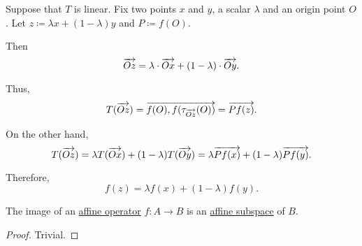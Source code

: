 \begin{defproof}
   Suppose that \( T \) is linear. Fix two points \( x \) and \( y \), a scalar \( \lambda \) and an origin point \( O \). Let \( z \coloneqq \lambda x + (1 - \lambda) y \) and \( P \coloneqq f(O) \).

  Then
  \begin{equation*}
    \overrightarrow{Oz} = \lambda \cdot \overrightarrow{Ox} + (1 - \lambda) \cdot \overrightarrow{Oy}.
  \end{equation*}

  Thus,
  \begin{equation*}
    T(\overrightarrow{Oz}) = \overrightarrow{ f(O), f(\tau_{\overrightarrow{Oz}}(O)) } = \overrightarrow{ P f(z) }.
  \end{equation*}

  On the other hand,
  \begin{equation*}
    T(\overrightarrow{Oz})
    =
    \lambda T(\overrightarrow{Ox}) + (1 - \lambda) T(\overrightarrow{Oy})
    =
    \lambda \overrightarrow{ P f(x) } + (1 - \lambda) \overrightarrow{ P f(y) }.
  \end{equation*}

  Therefore,
  \begin{equation*}
    f(z) = \lambda f(x) + (1 - \lambda) f(y).
  \end{equation*}
\end{defproof}

\begin{proposition}\label{thm:image_of_affine_operator}
  The image of an \hyperref[def:affine_operator]{affine operator} \( f: A \to B \) is an \hyperref[def:affine_subspace]{affine subspace} of \( B \).
\end{proposition}
\begin{proof}
  Trivial.
\end{proof}

